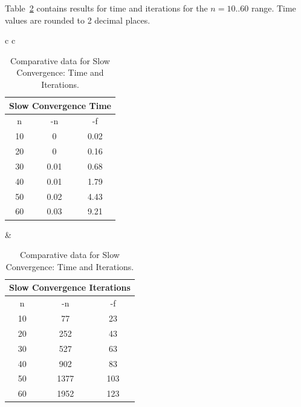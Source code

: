 Table~\ref{tab:slow} contains results for time and iterations for the $n = 10..60$ range. Time values are rounded to 2 decimal places.

\begin{table}[h!]
	\centering
	\begin{tabular}{c c}
		\begin{minipage}{.5\textwidth}
			\centering
			\begin{tabular}{| c | c | c |}
				\hline
				\multicolumn{3}{|c|}{Slow Convergence Time} \\ \hline
				n  & -n   & -f                              \\ \hline
				10 & 0    & 0.02                            \\ \hline
				20 & 0    & 0.16                            \\ \hline
				30 & 0.01 & 0.68                            \\ \hline
				40 & 0.01 & 1.79                            \\ \hline
				50 & 0.02 & 4.43                            \\ \hline
				60 & 0.03 & 9.21                            \\ \hline
			\end{tabular}
		\end{minipage} &
		\begin{minipage}{.5\textwidth}
			\centering
			\begin{tabular}{| c | c | c |}
				\hline
				\multicolumn{3}{|c|}{Slow Convergence Iterations} \\ \hline
				n  & -n   & -f                                    \\ \hline
				10 & 77   & 23                                    \\ \hline
				20 & 252  & 43                                    \\ \hline
				30 & 527  & 63                                    \\ \hline
				40 & 902  & 83                                    \\ \hline
				50 & 1377 & 103                                   \\ \hline
				60 & 1952 & 123                                   \\ \hline
			\end{tabular}
		\end{minipage}
	\end{tabular}
	\caption{Comparative data for Slow Convergence: Time and Iterations.}
	\label{tab:slow}
\end{table}

